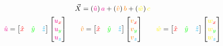 \documentclass[preview]{standalone}
\begin{document}
$$\vec{X} = \left(\textcolor{magenta}{\hat{u}}\right)\textcolor{magenta}{a} + \left(\textcolor{orange}{\hat{v}}\right)\textcolor{orange}{b} + \left(\textcolor{yellow}{\hat{w}}\right)\textcolor{yellow}{c}$$
$$\begin{align*}
\textcolor{magenta}{\hat{u}} = \begin{bmatrix}\textcolor{red}{\hat{x}}&\textcolor{green}{\hat{y}}&\textcolor{cyan}{\hat{z}}\end{bmatrix}\begin{bmatrix}\textcolor{magenta}{u}_{\textcolor{red}{x}}\\\textcolor{magenta}{u}_{\textcolor{green}{y}}\\\textcolor{magenta}{u}_{\textcolor{cyan}{z}}\end{bmatrix}
&\quad&
\textcolor{orange}{\hat{v}} = \begin{bmatrix}\textcolor{red}{\hat{x}}&\textcolor{green}{\hat{y}}&\textcolor{cyan}{\hat{z}}\end{bmatrix}\begin{bmatrix}\textcolor{orange}{v}_{\textcolor{red}{x}}\\\textcolor{orange}{v}_{\textcolor{green}{y}}\\\textcolor{orange}{v}_{\textcolor{cyan}{z}}\end{bmatrix}
&\quad&
\textcolor{yellow}{\hat{w}} = \begin{bmatrix}\textcolor{red}{\hat{x}}&\textcolor{green}{\hat{y}}&\textcolor{cyan}{\hat{z}}\end{bmatrix}\begin{bmatrix}\textcolor{yellow}{w}_{\textcolor{red}{x}}\\\textcolor{yellow}{w}_{\textcolor{green}{y}}\\\textcolor{yellow}{w}_{\textcolor{cyan}{z}}\end{bmatrix}
\end{align*}$$
\end{document}
